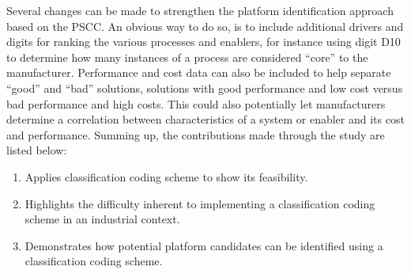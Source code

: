 Several changes can be made to strengthen the platform identification approach based on the PSCC.
An obvious way to do so, is to include additional drivers and digits for ranking the various processes and enablers, for instance using digit D10 to determine how many instances of a process are considered ``core'' to the manufacturer.
Performance and cost data can also be included to help separate ``good'' and ``bad'' solutions, \ie{} solutions with good performance and low cost versus bad performance and high costs.
This could also potentially let manufacturers determine a correlation between characteristics of a system or enabler and its cost and performance.
Summing up, the contributions made through the study are listed below:
\begin{enumerate}
  \item Applies  classification coding scheme to show its feasibility.
  \item Highlights the difficulty inherent to implementing a classification coding scheme in an industrial context.
  \item Demonstrates how potential platform candidates can be identified using a classification coding scheme.
 \end{enumerate}